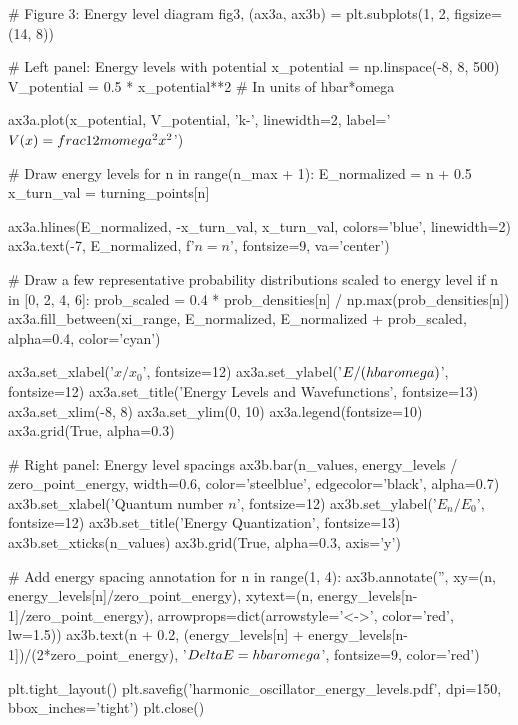 \documentclass[a4paper, 11pt]{article}
\begin{document}
\begin{pycode}
# Figure 3: Energy level diagram
fig3, (ax3a, ax3b) = plt.subplots(1, 2, figsize=(14, 8))

# Left panel: Energy levels with potential
x_potential = np.linspace(-8, 8, 500)
V_potential = 0.5 * x_potential**2  # In units of hbar*omega

ax3a.plot(x_potential, V_potential, 'k-', linewidth=2, label='$V(x) = \\frac{1}{2}m\\omega^2 x^2$')

# Draw energy levels
for n in range(n_max + 1):
    E_normalized = n + 0.5
    x_turn_val = turning_points[n]

    ax3a.hlines(E_normalized, -x_turn_val, x_turn_val, colors='blue', linewidth=2)
    ax3a.text(-7, E_normalized, f'$n={n}$', fontsize=9, va='center')

    # Draw a few representative probability distributions scaled to energy level
    if n in [0, 2, 4, 6]:
        prob_scaled = 0.4 * prob_densities[n] / np.max(prob_densities[n])
        ax3a.fill_between(xi_range, E_normalized, E_normalized + prob_scaled,
                         alpha=0.4, color='cyan')

ax3a.set_xlabel('$x/x_0$', fontsize=12)
ax3a.set_ylabel('$E/(\\hbar\\omega)$', fontsize=12)
ax3a.set_title('Energy Levels and Wavefunctions', fontsize=13)
ax3a.set_xlim(-8, 8)
ax3a.set_ylim(0, 10)
ax3a.legend(fontsize=10)
ax3a.grid(True, alpha=0.3)

# Right panel: Energy level spacings
ax3b.bar(n_values, energy_levels / zero_point_energy, width=0.6, color='steelblue',
         edgecolor='black', alpha=0.7)
ax3b.set_xlabel('Quantum number $n$', fontsize=12)
ax3b.set_ylabel('$E_n/E_0$', fontsize=12)
ax3b.set_title('Energy Quantization', fontsize=13)
ax3b.set_xticks(n_values)
ax3b.grid(True, alpha=0.3, axis='y')

# Add energy spacing annotation
for n in range(1, 4):
    ax3b.annotate('', xy=(n, energy_levels[n]/zero_point_energy),
                 xytext=(n, energy_levels[n-1]/zero_point_energy),
                 arrowprops=dict(arrowstyle='<->', color='red', lw=1.5))
    ax3b.text(n + 0.2, (energy_levels[n] + energy_levels[n-1])/(2*zero_point_energy),
             '$\\Delta E = \\hbar\\omega$', fontsize=9, color='red')

plt.tight_layout()
plt.savefig('harmonic_oscillator_energy_levels.pdf', dpi=150, bbox_inches='tight')
plt.close()
\end{pycode}
\end{document}
